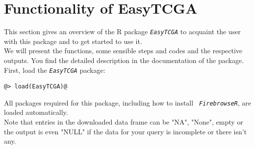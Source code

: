 \documentclass{TechReport}
\begin{document}
\section{Functionality of EasyTCGA}
This section gives an overview of the R package \texttt{\em EasyTCGA} to acquaint
the user with this package and to get started to use it.\\
We will present the functions, some sensible steps and codes and the respective
outputs. You find the detailed description in the
documentation of the package.\\
First, load the \texttt{\em EasyTCGA} package:
\begin{lstlisting}[style=base]
@> load(EasyTCGA)@
\end{lstlisting}
All packages required for this package, including how to install \texttt{\em
FirebrowseR}, are loaded automatically.\\
Note that entries in the downloaded data frame can be "NA", "None", empty or the output is even
"NULL" if the data for your query is incomplete or there isn't any.\\
\end{document}
